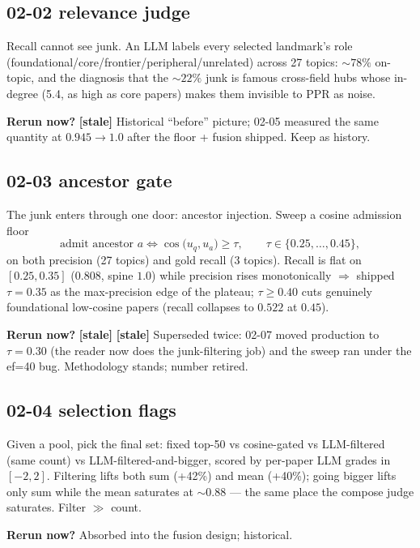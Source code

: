 \documentclass[10pt]{article}
\newcommand{\rerun}[1]{\par\smallskip\noindent\textbf{Rerun now?} #1}
\newcommand{\stale}{\textbf{[stale]} }
\begin{document}
\subsection*{02-02 relevance judge}
Recall cannot see junk. An LLM labels every selected landmark's role
(foundational/core/frontier/peripheral/unrelated) across 27 topics: ${\sim}78\%$ on-topic, and
the diagnosis that the ${\sim}22\%$ junk is famous cross-field hubs whose in-degree (5.4, as
high as core papers) makes them invisible to PPR as noise.
\rerun{\stale Historical ``before'' picture; 02-05 measured the same quantity at $0.945{\to}1.0$
after the floor + fusion shipped. Keep as history.}

\subsection*{02-03 ancestor gate}
The junk enters through one door: ancestor injection. Sweep a cosine admission floor
\begin{equation}
\text{admit ancestor } a \iff \cos\!\big(u_q, u_a\big) \ge \tau, \qquad \tau \in \{0.25,\dots,0.45\},
\end{equation}
on both precision (27 topics) and gold recall (3 topics). Recall is flat on $[0.25,0.35]$
($0.808$, spine $1.0$) while precision rises monotonically $\Rightarrow$ shipped $\tau=0.35$ as
the max-precision edge of the plateau; $\tau \ge 0.40$ cuts genuinely foundational low-cosine
papers (recall collapses to $0.522$ at $0.45$).
\rerun{\stale\stale Superseded twice: 02-07 moved production to $\tau=0.30$ (the reader now does
the junk-filtering job) and the sweep ran under the ef=40 bug. Methodology stands; number retired.}

\subsection*{02-04 selection flags}
Given a pool, pick the final set: fixed top-50 vs cosine-gated vs LLM-filtered (same count) vs
LLM-filtered-and-bigger, scored by per-paper LLM grades in $[-2,2]$. Filtering lifts both sum
(+42\%) and mean (+40\%); going bigger lifts only sum while the mean saturates at ${\sim}0.88$
--- the same place the compose judge saturates. Filter $\gg$ count.
\rerun{Absorbed into the fusion design; historical.}
\end{document}
